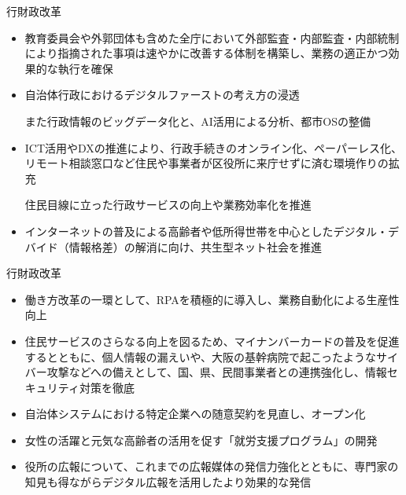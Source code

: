 \documentclass[dvipdfmx]{beamer}
\begin{document}
    \begin{frame}{行財政改革}{}
        \begin{small}
            \begin{itemize}
                \setlength{\parsep}{.5mm}
                \setlength{\itemsep}{2mm}
                \item 教育委員会や外郭団体も含めた全庁において外部監査・内部監査・内部統制により指摘された事項は速やかに改善する体制を構築し、業務の適正かつ効果的な執行を確保
                \item 自治体行政におけるデジタルファーストの考え方の浸透\par
                また行政情報のビッグデータ化と、AI活用による分析、都市OSの整備
                \item ICT活用やDXの推進により、行政手続きのオンライン化、ペーパーレス化、リモート相談窓口など住民や事業者が区役所に来庁せずに済む環境作りの拡充\par
                住民目線に立った行政サービスの向上や業務効率化を推進
                \item インターネットの普及による高齢者や低所得世帯を中心としたデジタル・デバイド（情報格差）の解消に向け、共生型ネット社会を推進
            \end{itemize}
        \end{small}
    \end{frame}

    \begin{frame}{行財政改革}{}
        \begin{small}
            \begin{itemize}
                \setlength{\parsep}{.5mm}
                \setlength{\itemsep}{2mm}
                \item 働き方改革の一環として、RPAを積極的に導入し、業務自動化による生産性向上
                \item 住民サービスのさらなる向上を図るため、マイナンバーカードの普及を促進するとともに、個人情報の漏えいや、大阪の基幹病院で起こったようなサイバー攻撃などへの備えとして、国、県、民間事業者との連携強化し、情報セキュリティ対策を徹底
                \item 自治体システムにおける特定企業への随意契約を見直し、オープン化
                \item 女性の活躍と元気な高齢者の活用を促す「就労支援プログラム」の開発
                \item 役所の広報について、これまでの広報媒体の発信力強化とともに、専門家の知見も得ながらデジタル広報を活用したより効果的な発信
            \end{itemize}
        \end{small}
    \end{frame}
\end{document}
